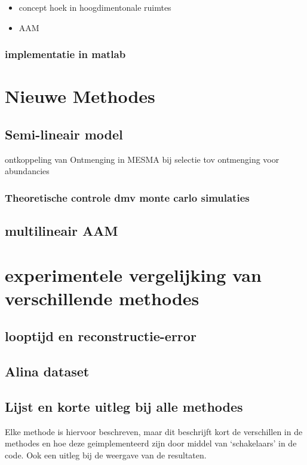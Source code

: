 \documentclass[12pt]{report}
\begin{document}
\begin{itemize}
\item concept hoek in hoogdimentonale ruimtes
\item AAM
\end{itemize}

\subsection{implementatie in matlab}


\chapter{Nieuwe Methodes}

\section{Semi-lineair model}

ontkoppeling van Ontmenging in MESMA bij selectie tov ontmenging voor abundancies

\subsection{Theoretische controle dmv monte carlo simulaties}

\section{multilineair AAM}

\chapter{experimentele vergelijking van verschillende methodes}

\section{looptijd en reconstructie-error}

\section{Alina dataset}

\section{Lijst en korte uitleg bij alle methodes}

Elke methode is hiervoor beschreven, maar dit beschrijft kort de verschillen in de methodes en hoe deze geimplementeerd zijn door middel van `schakelaars' in de code. Ook een uitleg bij de weergave van de resultaten. 
\end{document}
